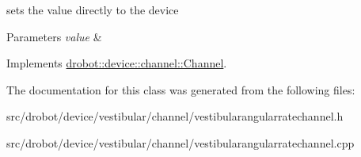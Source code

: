 sets the value directly to the device 


\begin{DoxyParams}{Parameters}
{\em value} & \\
\hline
\end{DoxyParams}


Implements \hyperlink{classdrobot_1_1device_1_1channel_1_1Channel_a612a3f6afe59e238583d6d40d9ddcaf8}{drobot\-::device\-::channel\-::\-Channel}.



The documentation for this class was generated from the following files\-:\begin{DoxyCompactItemize}
\item 
src/drobot/device/vestibular/channel/vestibularangularratechannel.\-h\item 
src/drobot/device/vestibular/channel/vestibularangularratechannel.\-cpp\end{DoxyCompactItemize}
